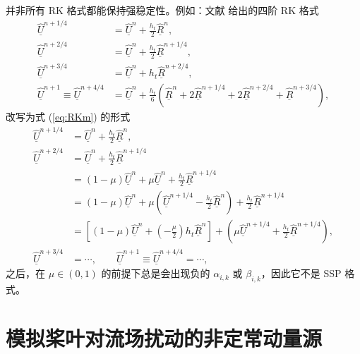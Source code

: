 并非所有 RK 格式都能保持强稳定性。例如：文献 \cite{Hirsch_2007} 给出的四阶 RK 格式
\begin{equation}
\begin{aligned}\underline{\hat{U}}^{n+1/4} & =\underline{\hat{U}}^{n}+\frac{h_{t}}{2}\underline{\hat{R}}^{n},\\
\underline{\hat{U}}^{n+2/4} & =\underline{\hat{U}}^{n}+\frac{h_{t}}{2}\underline{\hat{R}}^{n+1/4},\\
\underline{\hat{U}}^{n+3/4} & =\underline{\hat{U}}^{n}+h_{t}\underline{\hat{R}}^{n+2/4},\\
\underline{\hat{U}}^{n+1}\equiv\underline{\hat{U}}^{n+4/4} & =\underline{\hat{U}}^{n}+\frac{h_{t}}{6}\left(\underline{\hat{R}}^{n}+2\underline{\hat{R}}^{n+1/4}+2\underline{\hat{R}}^{n+2/4}+\underline{\hat{R}}^{n+3/4}\right),
\end{aligned}
\end{equation}
改写为式 (\ref{eq:RKm}) 的形式
\begin{equation}
\begin{aligned}\underline{\hat{U}}^{n+1/4} & =\underline{\hat{U}}^{n}+\frac{h_{t}}{2}\underline{\hat{R}}^{n},\\
	\underline{\hat{U}}^{n+2/4} & =\underline{\hat{U}}^{n}+\frac{h_{t}}{2}\underline{\hat{R}}^{n+1/4}\\
	& =(1-\mu)\underline{\hat{U}}^{n}+\mu\underline{\hat{U}}^{n}+\frac{h_{t}}{2}\underline{\hat{R}}^{n+1/4}\\
	& =(1-\mu)\underline{\hat{U}}^{n}+\mu\left(\underline{\hat{U}}^{n+1/4}-\frac{h_{t}}{2}\underline{\hat{R}}^{n}\right)+\frac{h_{t}}{2}\underline{\hat{R}}^{n+1/4}\\
	& =\left[(1-\mu)\underline{\hat{U}}^{n}+\left(-\frac{\mu}{2}\right)h_{t}\underline{\hat{R}}^{n}\right]+\left(\mu\underline{\hat{U}}^{n+1/4}+\frac{h_{t}}{2}\underline{\hat{R}}^{n+1/4}\right),\\
	\underline{\hat{U}}^{n+3/4} & =\cdots,\qquad\underline{\hat{U}}^{n+1}\equiv\underline{\hat{U}}^{n+4/4}=\cdots,
\end{aligned}
\end{equation}
之后，在 $\mu\in(0,1)$ 的前提下总是会出现负的 $\alpha_{i,k}$ 或 $\beta_{i,k}$，因此它不是
SSP 格式。

\section{模拟桨叶对流场扰动的非定常动量源\label{sec:UMS}}


